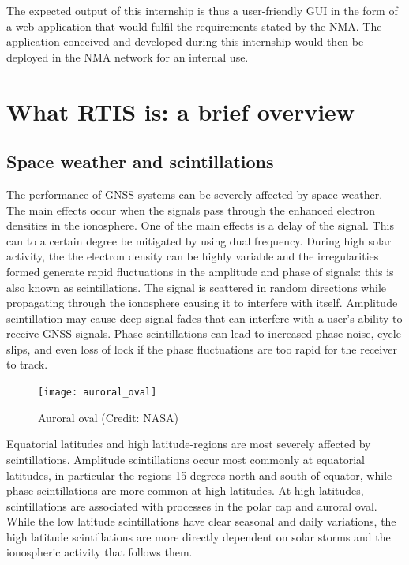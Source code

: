 \documentclass{themeensg}
\begin{document}
The expected output of this internship is thus a user-friendly GUI in the form of a web application that would fulfil the requirements stated by the NMA. The application conceived and developed during this internship would then be deployed in the NMA network for an internal use.
  \vspace{1.5cm}
	


\section{What RTIS is: a brief overview}

\subsection{Space weather and scintillations}

The performance of GNSS systems can be severely affected by space weather. The main effects occur when the signals pass through the enhanced electron densities in the ionosphere. One of the main effects is a delay of the signal. This can to a certain degree be mitigated by using dual frequency. During high solar activity, the the electron density can be highly variable and the irregularities formed generate rapid fluctuations in the amplitude and phase of signals: this is also known as scintillations. The signal is scattered in random directions while propagating through the ionosphere causing it to interfere with itself. Amplitude scintillation may cause deep signal fades that can interfere with a user’s ability to receive GNSS signals. Phase scintillations can lead to increased phase noise, cycle slips, and even loss of lock if the phase fluctuations are too rapid for the receiver to track.\

\begin{figure}[hb]
	\centering
	\texttt{[image: auroral\_oval]}
	\caption{Auroral oval (Credit: NASA)}
\end{figure}

Equatorial latitudes and high latitude-regions are most severely affected by scintillations. Amplitude scintillations occur most commonly at equatorial latitudes, in particular the regions 15 degrees north and south of equator, while phase scintillations are more common at high latitudes. At high latitudes, scintillations are associated with processes in the polar cap and auroral oval. While the low latitude scintillations have clear seasonal and daily variations, the high latitude scintillations are more directly dependent on solar storms and the ionospheric activity that follows them.\\
\end{document}
